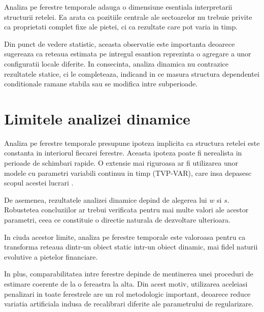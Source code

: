 Analiza pe ferestre temporale adauga o dimensiune esentiala interpretarii
structurii retelei. Ea arata ca pozitiile centrale ale sectoarelor nu trebuie
privite ca proprietati complet fixe ale pietei, ci ca rezultate care pot varia
in timp.

Din punct de vedere statistic, aceasta observatie este importanta deoarece
sugereaza ca reteaua estimata pe intregul esantion reprezinta o agregare a unor
configuratii locale diferite. In consecinta, analiza dinamica nu contrazice
rezultatele statice, ci le completeaza, indicand in ce masura structura
dependentei conditionale ramane stabila sau se modifica intre subperioade.

\section{Limitele analizei dinamice}

Analiza pe ferestre temporale presupune ipoteza implicita ca structura retelei
este constanta in interiorul fiecarei ferestre. Aceasta ipoteza poate fi
nerealista in perioade de schimbari rapide. O extensie mai riguroasa ar fi
utilizarea unor modele cu parametri variabili continuu in timp (TVP-VAR),
care insa depasesc scopul acestei lucrari \cite{diebold2014}.

De asemenea, rezultatele analizei dinamice depind de alegerea lui $w$ si $s$.
Robustetea concluziilor ar trebui verificata pentru mai multe valori ale
acestor parametri, ceea ce constituie o directie naturala de dezvoltare ulterioara.

In ciuda acestor limite, analiza pe ferestre temporale este valoroasa pentru
ca transforma reteaua dintr-un obiect static intr-un obiect dinamic, mai fidel
naturii evolutive a pietelor financiare.

In plus, comparabilitatea intre ferestre depinde de mentinerea unei proceduri
de estimare coerente de la o fereastra la alta. Din acest motiv, utilizarea
aceleiasi penalizari in toate ferestrele are un rol metodologic important,
deoarece reduce variatia artificiala indusa de recalibrari diferite ale
parametrului de regularizare.